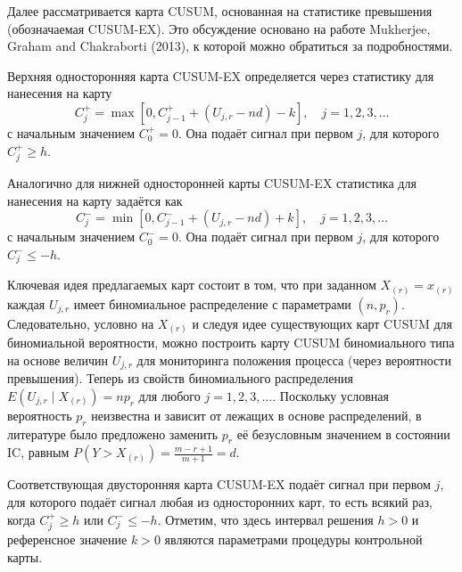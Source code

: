 Далее рассматривается карта CUSUM, основанная на статистике превышения (обозначаемая CUSUM-EX). Это обсуждение основано на работе Mukherjee, Graham and Chakraborti (2013), к которой можно обратиться за подробностями.

Верхняя односторонняя карта CUSUM-EX определяется через статистику для нанесения на карту
\begin{equation}
	C_j^+ = \max\left[ 0, C_{j-1}^+ + \left( U_{j,r} - nd \right) - k \right], \quad j = 1, 2, 3, \ldots
	\label{eq:4.52}
\end{equation}
с начальным значением \(C_0^+ = 0\). Она подаёт сигнал при первом \(j\), для которого \(C_j^+ \ge h\).

Аналогично для нижней односторонней карты CUSUM-EX статистика для нанесения на карту задаётся как
\begin{equation}
	C_j^- = \min\left[ 0, C_{j-1}^- + \left( U_{j,r} - nd \right) + k \right], \quad j = 1, 2, 3, \ldots
	\label{eq:4.53}
\end{equation}
с начальным значением \(C_0^- = 0\). Она подаёт сигнал при первом \(j\), для которого \(C_j^- \le -h\).

Ключевая идея предлагаемых карт состоит в том, что при заданном \(X_{(r)} = x_{(r)}\) каждая \(U_{j,r}\) имеет биномиальное распределение с параметрами \((n, p_r)\). Следовательно, условно на \(X_{(r)}\) и следуя идее существующих карт CUSUM для биномиальной вероятности, можно построить карту CUSUM биномиального типа на основе величин \(U_{j,r}\) для мониторинга положения процесса (через вероятности превышения). Теперь из свойств биномиального распределения \(E\left( U_{j,r} \mid X_{(r)} \right) = np_r\) для любого \(j = 1, 2, 3, \ldots\). Поскольку условная вероятность \(p_r\) неизвестна и зависит от лежащих в основе распределений, в литературе было предложено заменить \(p_r\) её безусловным значением в состоянии IC, равным \(P\left( Y > X_{(r)} \right) = \frac{m - r + 1}{m + 1} = d\).

Соответствующая двусторонняя карта CUSUM-EX подаёт сигнал при первом \(j\), для которого подаёт сигнал любая из односторонних карт, то есть всякий раз, когда \(C_j^+ \ge h\) или \(C_j^- \le -h\). Отметим, что здесь интервал решения \(h > 0\) и референсное значение \(k > 0\) являются параметрами процедуры контрольной карты.

